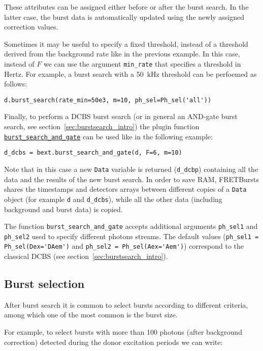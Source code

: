 These attributes can be assigned either before or after the burst search. In the latter case, the burst data is
automatically updated using the newly assigned correction values.

Sometimes it may be useful to specify a fixed threshold, instead 
of a threshold derived from the background rate like in the previous example. In this case, instead of $F$ we can use the argument \verb|min_rate| that specifies a threshold in Hertz. For example, a burst search with a 50~kHz
threshold can be perfoemed as follows:

\begin{verbatim}
d.burst_search(rate_min=50e3, m=10, ph_sel=Ph_sel('all'))
\end{verbatim}

Finally, to perform a DCBS burst search (or in general an AND-gate burst search, 
see section~\ref{sec:burstsearch_intro}) the plugin function 
\href{http://fretbursts.readthedocs.org/en/latest/plugins.html#fretbursts.burstlib_ext.burst_search_and_gate}{\verb|burst_search_and_gate|} 
can be used like in the following example:

\begin{verbatim}
d_dcbs = bext.burst_search_and_gate(d, F=6, m=10)
\end{verbatim}

Note that in this case a new \verb|Data| variable is returned (\verb|d_dcbp|) containing all the data and the results of the new burst search. In order to save RAM, FRETBursts shares the timestamps and detectors arrays between different copies of a \verb|Data| object (for example \verb|d| and \verb|d_dcbs|), while all the other data (including background and burst data) is copied. 

The function \verb|burst_search_and_gate| accepts additional arguments \verb|ph_sel1| and \verb|ph_sel2| 
used to specify different photons streams. The default values 
(\verb|ph_sel1 = Ph_sel(Dex='DAem')| and \verb|ph_sel2 = Ph_sel(Aex='Aem')|) correspond to the classical DCBS 
(see section~\ref{sec:burstsearch_intro}).

\subsection{Burst selection}
\label{sec:burstsel}

After burst search it is common to select bursts according to different criteria, among which one of the most common is the burst size.

For example, to select bursts with more than 100 photons (after background correction) detected during the donor excitation periods we can write:

